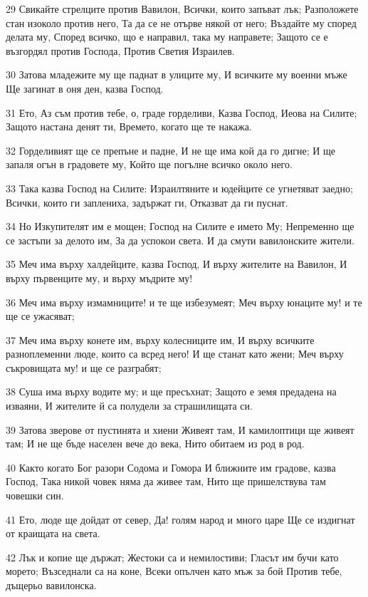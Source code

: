 \par 29 Свикайте стрелците против Вавилон, Всички, които запъват лък; Разположете стан изоколо против него, Та да се не отърве някой от него; Въздайте му според делата му, Според всичко, що е направил, така му направете; Защото се е възгордял против Господа, Против Светия Израилев.
\par 30 Затова младежите му ще паднат в улиците му, И всичките му военни мъже Ще загинат в оня ден, казва Господ.
\par 31 Ето, Аз съм против тебе, о, граде горделиви, Казва Господ, Иеова на Силите; Защото настана денят ти, Времето, когато ще те накажа.
\par 32 Горделивият ще се препъне и падне, И не ще има кой да го дигне; И ще запаля огън в градовете му, Който ще погълне всичко около него.
\par 33 Така казва Господ на Силите: Израилтяните и юдейците се угнетяват заедно; Всички, които ги заплениха, задържат ги, Отказват да ги пуснат.
\par 34 Но Изкупителят им е мощен; Господ на Силите е името Му; Непременно ще се застъпи за делото им, За да успокои света. И да смути вавилонските жители.
\par 35 Меч има върху халдейците, казва Господ, И върху жителите на Вавилон, И върху първенците му, и върху мъдрите му!
\par 36 Меч има върху измамниците! и те ще избезумеят; Меч върху юнаците му! и те ще се ужасяват;
\par 37 Меч има върху конете им, върху колесниците им, И върху всичките разноплеменни люде, които са всред него! И ще станат като жени; Меч върху съкровищата му! и ще се разграбят;
\par 38 Суша има върху водите му; и ще пресъхнат; Защото е земя предадена на изваяни, И жителите й са полудели за страшилищата си.
\par 39 Затова зверове от пустинята и хиени Живеят там, И камилоптици ще живеят там; И не ще бъде населен вече до века, Нито обитаем из род в род.
\par 40 Както когато Бог разори Содома и Гомора И ближните им градове, казва Господ, Така никой човек няма да живее там, Нито ще пришелствува там човешки син.
\par 41 Ето, люде ще дойдат от север, Да! голям народ и много царе Ще се издигнат от краищата на света.
\par 42 Лък и копие ще държат; Жестоки са и немилостиви; Гласът им бучи като морето; Възседнали са на коне, Всеки опълчен като мъж за бой Против тебе, дъщерьо вавилонска.
